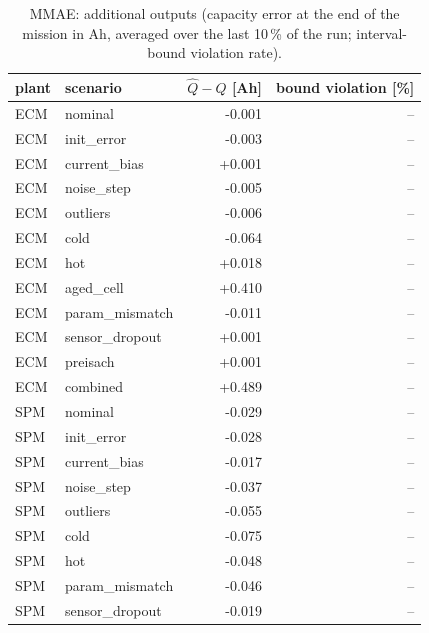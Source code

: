\begin{table}[H]\centering\small\caption{MMAE: additional outputs (capacity error at the end of the mission in Ah, averaged over the last 10\,\% of the run; interval-bound violation rate).}\label{tab:cellx_MMAE}
\begin{tabular}{llrr}\toprule plant & scenario & $\hat Q - Q$ [Ah] & bound violation [\%] \\ \midrule
ECM & nominal & -0.001 & -- \\
ECM & init\_error & -0.003 & -- \\
ECM & current\_bias & +0.001 & -- \\
ECM & noise\_step & -0.005 & -- \\
ECM & outliers & -0.006 & -- \\
ECM & cold & -0.064 & -- \\
ECM & hot & +0.018 & -- \\
ECM & aged\_cell & +0.410 & -- \\
ECM & param\_mismatch & -0.011 & -- \\
ECM & sensor\_dropout & +0.001 & -- \\
ECM & preisach & +0.001 & -- \\
ECM & combined & +0.489 & -- \\
SPM & nominal & -0.029 & -- \\
SPM & init\_error & -0.028 & -- \\
SPM & current\_bias & -0.017 & -- \\
SPM & noise\_step & -0.037 & -- \\
SPM & outliers & -0.055 & -- \\
SPM & cold & -0.075 & -- \\
SPM & hot & -0.048 & -- \\
SPM & param\_mismatch & -0.046 & -- \\
SPM & sensor\_dropout & -0.019 & -- \\
\bottomrule\end{tabular}\end{table}
